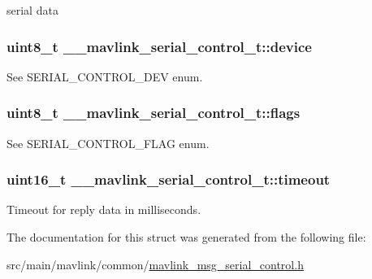 serial data 

\hypertarget{struct____mavlink__serial__control__t_a2326bf29dd4cf72192fa2deeeb64d806}{
\subsubsection[{device}]{\setlength{\rightskip}{0pt plus 5cm}uint8\+\_\+t \+\_\+\+\_\+mavlink\+\_\+serial\+\_\+control\+\_\+t\+::device}}\label{struct____mavlink__serial__control__t_a2326bf29dd4cf72192fa2deeeb64d806}


See S\+E\+R\+I\+A\+L\+\_\+\+C\+O\+N\+T\+R\+O\+L\+\_\+\+D\+E\+V enum. 

\hypertarget{struct____mavlink__serial__control__t_a73536aa8d96ff6146fb62869d3d25e0f}{
\subsubsection[{flags}]{\setlength{\rightskip}{0pt plus 5cm}uint8\+\_\+t \+\_\+\+\_\+mavlink\+\_\+serial\+\_\+control\+\_\+t\+::flags}}\label{struct____mavlink__serial__control__t_a73536aa8d96ff6146fb62869d3d25e0f}


See S\+E\+R\+I\+A\+L\+\_\+\+C\+O\+N\+T\+R\+O\+L\+\_\+\+F\+L\+A\+G enum. 

\hypertarget{struct____mavlink__serial__control__t_af55fbe28104f724964546c2a71086a54}{
\subsubsection[{timeout}]{\setlength{\rightskip}{0pt plus 5cm}uint16\+\_\+t \+\_\+\+\_\+mavlink\+\_\+serial\+\_\+control\+\_\+t\+::timeout}}\label{struct____mavlink__serial__control__t_af55fbe28104f724964546c2a71086a54}


Timeout for reply data in milliseconds. 



The documentation for this struct was generated from the following file\+:\begin{DoxyCompactItemize}
\item 
src/main/mavlink/common/\hyperlink{mavlink__msg__serial__control_8h}{mavlink\+\_\+msg\+\_\+serial\+\_\+control.\+h}\end{DoxyCompactItemize}
